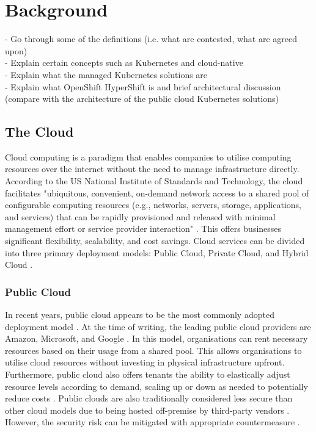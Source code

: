 \chapter{Background}

- Go through some of the definitions (i.e. what are contested, what are agreed upon)\\
- Explain certain concepts such as Kubernetes and cloud-native\\
- Explain what the managed Kubernetes solutions are\\
- Explain what OpenShift HyperShift is and brief architectural discussion (compare with the architecture of the public cloud Kubernetes solutions)\\

\section{The Cloud}

Cloud computing is a paradigm that enables companies to utilise computing resources over the internet without the need to manage infrastructure directly. According to the US National Institute of Standards and Technology, the cloud facilitates "ubiquitous, convenient, on-demand network access to a shared pool of configurable computing resources (e.g., networks, servers, storage, applications, and services) that can be rapidly provisioned and released with minimal management effort or service provider interaction" \cite{editorCloudComputingGlossary}. This offers businesses significant flexibility, scalability, and cost savings. Cloud services can be divided into three primary deployment models: Public Cloud, Private Cloud, and Hybrid Cloud \cite{ramgovind2010management}.

\subsection{Public Cloud}

In recent years, public cloud appears to be the most commonly adopted deployment model \cite{VoiceKubernetesExperts,CNCFAnnualSurvey2024, opara2016critical}. At the time of writing, the leading public cloud providers are Amazon, Microsoft, and Google \cite{2024StateCloud}. In this model, organisations can rent necessary resources based on their usage from a shared pool. This allows organisations to utilise cloud resources without investing in physical infrastructure upfront. Furthermore, public cloud also offers tenants the ability to elastically adjust resource levels according to demand, scaling up or down as needed to potentially reduce costs \cite{suleiman2012understanding}. Public clouds are also traditionally considered less secure than other cloud models due to being hosted off-premise by third-party vendors \cite{sakr2011survey}. However, the security risk can be mitigated with appropriate countermeasure \cite{fox2009above}.


